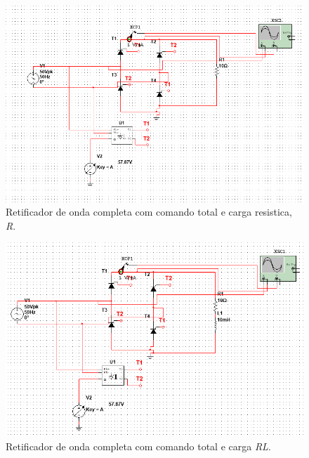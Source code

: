 \documentclass[a4paper,11pt]{article}
\numberwithin{equation}{section}
\begin{document}
\begin{figure}[h]
	\centering
	\includegraphics[keepaspectratio=true, scale=0.5]{img/circuito1}
	\caption{Retificador de onda completa com comando total e carga resistica, \textit{R}.}
	\label{fig:circuit_3}
	\vspace{-0.8em}
\end{figure}

\begin{figure}[h]
	\centering
	\includegraphics[keepaspectratio=true, scale=0.5]{img/circuito2}
	\caption{Retificador de onda completa com comando total e carga \textit{RL}.}
	\label{fig:circuit_4}
	\vspace{-0.8em}
\end{figure}
\end{document}
